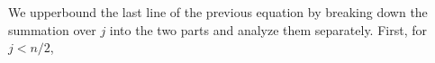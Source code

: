 \documentclass[aos]{imsart}
\begin{document}
\medskip
{} 
%
We upperbound the last line of the previous equation by breaking down the summation over $j$ into the two parts and analyze them separately. First, for $j < n/2$, 
\end{document}
